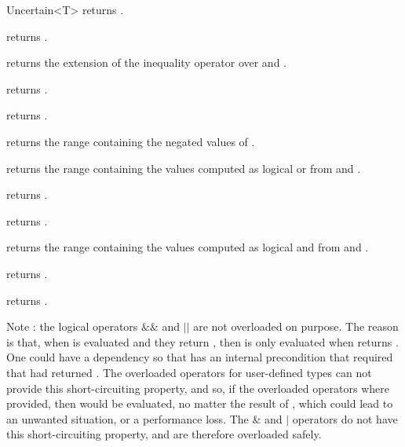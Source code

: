 \begin{ccRefClass}{Uncertain<T>}
  {returns .}

  {returns .}

  {returns the extension of the inequality operator over  and .}

  {returns .}

  {returns .}


  {returns the range containing the negated values of .}

  {returns the range containing the values computed as logical or from  and .}

  {returns .}

  {returns .}

  {returns the range containing the values computed as logical and from  and .}

  {returns .}

  {returns .}

  Note : the logical operators $\&\&$ and $||$ are not overloaded on purpose.  The reason
  is that, when  is evaluated and they return , then 
  is only evaluated when  returns .  One could have a dependency so
  that  has an internal precondition that required that  had returned .
  The overloaded operators for user-defined types can not provide this short-circuiting
  property, and so, if the overloaded operators where provided, then  would
  be evaluated, no matter the result of , which could lead to an unwanted
  situation, or a performance loss.  The $\&$ and $|$ operators do not have
  this short-circuiting property, and are therefore overloaded safely.


\end{ccRefClass}
